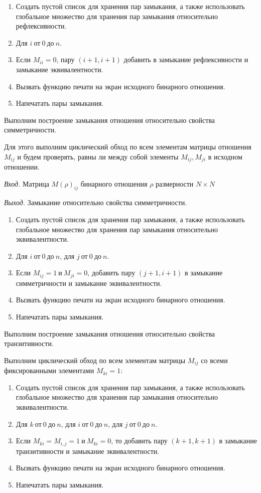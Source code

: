 \documentclass[bachelor, och, labwork]{shiza}
\begin{document}
\begin{enumerate}
    \item Создать пустой список для хранения пар замыкания, а также использовать
    глобальное множество для хранения пар замыкания относительно рефлексивности.
    \item Для $i ~\text{от}~ 0 ~\text{до}~ n$.
    \item Если $M_{ii} = 0$, пару $(i + 1, i + 1)$ добавить в замыкание 
    рефлексивности и замыкание эквивалентности.    
    \item Вызвать функцию печати на экран исходного бинарного отношения.
    \item Напечатать пары замыкания.
\end{enumerate}

Выполним построение замыкания отношения относительно свойства 
симметричности.

Для этого выполним циклический обход по всем элементам матрицы 
отношения $M_{ij}$ и будем проверять, равны ли между собой элементы 
$M_{ij},M_{ji}$ в исходном отношении.

\textit{Вход.} Матрица $M(\rho)_{ij}$ бинарного отношения $\rho$ размерности
$N \times N$

\textit{Выход.} Замыкание относительно свойства симметричности.

\begin{enumerate}
    \item Создать пустой список для хранения пар замыкания, а также использовать
    глобальное множество для хранения пар замыкания относительно эквивалентности.
    \item Для $i ~\text{от}~ 0 ~\text{до}~ n$, для $j ~\text{от}~ 0 ~\text{до}~ n$.
    \item Если $M_{ij} = 1 ~\text{и}~ M_{ji} = 0$, добавить пару $(j + 1, i + 1)$
     в замыкание симметричности и замыкание эквивалентности.
    \item Вызвать функцию печати на экран исходного бинарного отношения.
    \item Напечатать пары замыкания.
\end{enumerate}

Выполним построение замыкания отношения относительно свойства транзитивности.

Выполним циклический обход по всем элементам матрицы $M_{ij}$ со всеми
фиксированными элементами $M_{ki}=1$:

\begin{enumerate}
    \item Создать пустой список для хранения пар замыкания, а также использовать
    глобальное множество для хранения пар замыкания относительно эквивалентности.
    \item Для $k ~\text{от}~ 0 ~\text{до}~ n$, для $i ~\text{от}~ 0 ~\text{до}~ n$,
    для $j ~\text{от}~ 0 ~\text{до}~ n$.
    \item Если $M_{ki}=M_{i,j}=1 ~\text{и}~ M_{ki}=0$, то добавить пару
    $(k + 1, k + 1)$ в замыкание транзитивности и замыкание эквивалентности.
    \item Вызвать функцию печати на экран исходного бинарного отношения.
    \item Напечатать пары замыкания.
\end{enumerate}
\end{document}
